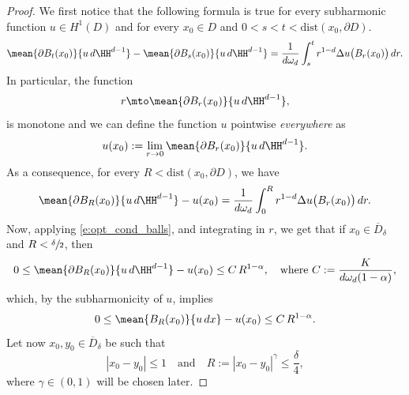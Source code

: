 \begin{proof}
We first notice that the following formula is true for every subharmonic function $u\in H^1(D)$ and for every $x_0\in D$ and $0<s<t<\text{dist}(x_0,\partial D)$.
\[\mean{\partial B_t(x_0)}{u\,d\HH^{d-1}}-\mean{\partial B_s(x_0)}{u\,d\HH^{d-1}}=\frac{1}{d\omega_d}\int_s^t r^{1-d}\Delta u\big(B_r(x_0)\big)\,dr.\]
In particular, the function
\[r\mto \mean{\partial B_r(x_0)}{u\,d\HH^{d-1}},\]
is monotone and we can define the function $u$ pointwise {\it everywhere} as
\[u(x_0):=\lim_{r\to0}\mean{\partial B_r(x_0)}{u\,d\HH^{d-1}}.\]
As a consequence, for every $R<\text{dist}(x_0,\partial D)$, we have
\[\mean{\partial B_R(x_0)}{u\,d\HH^{d-1}}-u(x_0)=\frac{1}{d\omega_d}\int_0^R r^{1-d}\Delta u\big(B_r(x_0)\big)\,dr.\]
Now, applying \eqref{e:opt_cond_balls}, and integrating in $r$, we get that if $x_0\in \overline D_\delta$ and $R<\sfrac\delta2$, then
\begin{equation}%
0\le \mean{\partial B_R(x_0)}{u\,d\HH^{d-1}}-u(x_0)\le C\,R^{1-\alpha},\quad\text{where } C:=\frac{K}{d\omega_d(1-\alpha)},
\end{equation}
which, by the subharmonicity of $u$, implies
\begin{equation}\label{e:mean_continuity2}
0\le \mean{B_R(x_0)}{u\,dx}-u(x_0)\le C\,R^{1-\alpha}.
\end{equation}
Let now $x_0,y_0\in \overline D_\delta$ be such that
\[|x_0-y_0|\le 1\quad\text{and}\quad R:=|x_0-y_0|^{\gamma}\le \frac\delta4,\]
where $\gamma\in(0,1)$ will be chosen later.


\end{proof}
